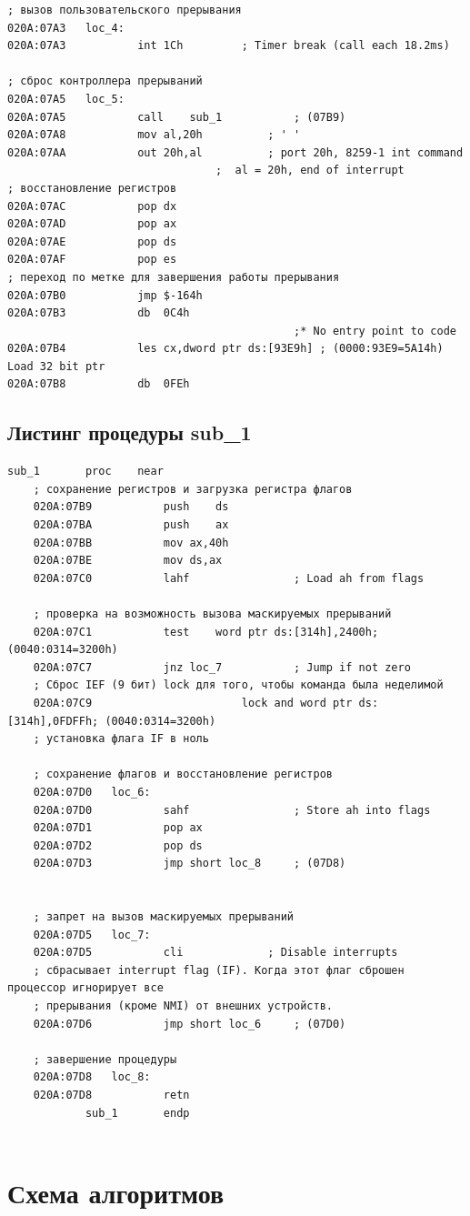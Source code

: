 \documentclass[a4paper,12pt]{article}
\begin{document}
\begin{lstlisting}[style={asm}]
; вызов пользовательского прерывания
020A:07A3	loc_4:
020A:07A3			int	1Ch			; Timer break (call each 18.2ms)

; сброс контроллера прерываний
020A:07A5	loc_5:
020A:07A5			call	sub_1			; (07B9)
020A:07A8			mov	al,20h			; ' '
020A:07AA			out	20h,al			; port 20h, 8259-1 int command
								;  al = 20h, end of interrupt
; восстановление регистров
020A:07AC			pop	dx
020A:07AD			pop	ax
020A:07AE			pop	ds
020A:07AF			pop	es
; переход по метке для завершения работы прерывания
020A:07B0			jmp	$-164h
020A:07B3			db	0C4h
					                        ;* No entry point to code
020A:07B4			les	cx,dword ptr ds:[93E9h]	; (0000:93E9=5A14h) Load 32 bit ptr
020A:07B8			db	0FEh

\end{lstlisting}

\clearpage
\subsection{Листинг процедуры sub\_1}

\begin{lstlisting}[style={asm}]
	sub_1		proc	near
	; сохранение регистров и загрузка регистра флагов
	020A:07B9			push	ds
	020A:07BA			push	ax
	020A:07BB			mov	ax,40h
	020A:07BE			mov	ds,ax
	020A:07C0			lahf				; Load ah from flags
	
	; проверка на возможность вызова маскируемых прерываний
	020A:07C1			test	word ptr ds:[314h],2400h; (0040:0314=3200h)
	020A:07C7			jnz	loc_7			; Jump if not zero
	; Сброс IEF (9 бит) lock для того, чтобы команда была неделимой
	020A:07C9	                    lock and word ptr ds:[314h],0FDFFh; (0040:0314=3200h)
	; установка флага IF в ноль
	
	; сохранение флагов и восстановление регистров
	020A:07D0	loc_6:
	020A:07D0			sahf				; Store ah into flags
	020A:07D1			pop	ax
	020A:07D2			pop	ds
	020A:07D3			jmp	short loc_8		; (07D8)
	
	
	; запрет на вызов маскируемых прерываний
	020A:07D5	loc_7:
	020A:07D5			cli				; Disable interrupts
	; сбрасывает interrupt flag (IF). Когда этот флаг сброшен процессор игнорирует все  
	; прерывания (кроме NMI) от внешних устройств.
	020A:07D6			jmp	short loc_6		; (07D0)
	
	; завершение процедуры
	020A:07D8	loc_8:
	020A:07D8			retn
			sub_1		endp
	
\end{lstlisting}
\clearpage

\section{Схема алгоритмов}
\end{document}
